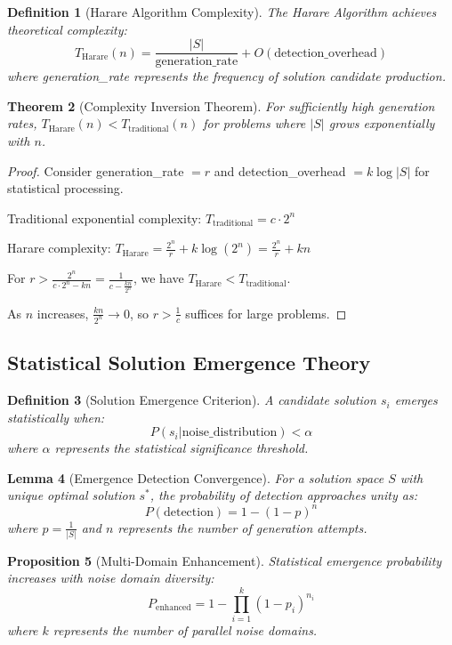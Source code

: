 \documentclass[11pt,a4paper]{article}
\newtheorem{theorem}{Theorem}[section]
\newtheorem{lemma}[theorem]{Lemma}
\newtheorem{definition}[theorem]{Definition}
\newtheorem{proposition}[theorem]{Proposition}
\theoremstyle{remark}
\begin{document}
\begin{definition}[Harare Algorithm Complexity]
The Harare Algorithm achieves theoretical complexity:
$$T_{\text{Harare}}(n) = \frac{|S|}{\text{generation\_rate}} + O(\text{detection\_overhead})$$
where generation\_rate represents the frequency of solution candidate production.
\end{definition}

\begin{theorem}[Complexity Inversion Theorem]
For sufficiently high generation rates, $T_{\text{Harare}}(n) < T_{\text{traditional}}(n)$ for problems where $|S|$ grows exponentially with $n$.
\end{theorem}

\begin{proof}
Consider generation\_rate $= r$ and detection\_overhead $= k \log|S|$ for statistical processing.

Traditional exponential complexity: $T_{\text{traditional}} = c \cdot 2^n$

Harare complexity: $T_{\text{Harare}} = \frac{2^n}{r} + k \log(2^n) = \frac{2^n}{r} + kn$

For $r > \frac{2^n}{c \cdot 2^n - kn} = \frac{1}{c - \frac{kn}{2^n}}$, we have $T_{\text{Harare}} < T_{\text{traditional}}$.

As $n$ increases, $\frac{kn}{2^n} \to 0$, so $r > \frac{1}{c}$ suffices for large problems.
\end{proof}

\subsection{Statistical Solution Emergence Theory}

\begin{definition}[Solution Emergence Criterion]
A candidate solution $s_i$ emerges statistically when:
$$P(s_i | \text{noise\_distribution}) < \alpha$$
where $\alpha$ represents the statistical significance threshold.
\end{definition}

\begin{lemma}[Emergence Detection Convergence]
For a solution space $S$ with unique optimal solution $s^*$, the probability of detection approaches unity as:
$$P(\text{detection}) = 1 - (1 - p)^n$$
where $p = \frac{1}{|S|}$ and $n$ represents the number of generation attempts.
\end{lemma}

\begin{proposition}[Multi-Domain Enhancement]
Statistical emergence probability increases with noise domain diversity:
$$P_{\text{enhanced}} = 1 - \prod_{i=1}^k (1 - p_i)^{n_i}$$
where $k$ represents the number of parallel noise domains.
\end{proposition}
\end{document}
